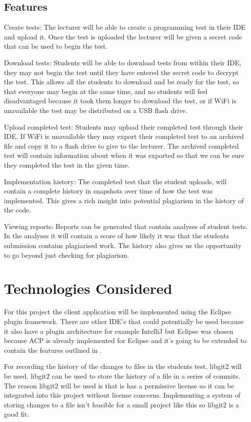 \documentclass[twocolumn]{article}
\begin{document}
\subsection{Features} \label{sec:Features}
Create tests: The lecturer will be able to create a programming test in their
IDE and upload it. Once the test is uploaded the lecturer will be given a secret
code that can be used to begin the test.

Download tests: Students will be able to download tests from within their IDE,
they may not begin the test until they have entered the secret code to decrypt
the test. This allows all the students to download and be ready for the test, so
that everyone may begin at the same time, and no students will feel
disadvantaged because it took them longer to download the test, or if WiFi is
unavailable the test may be distributed on a USB flash drive.

Upload completed test: Students may upload their completed test through their
IDE. If WiFi is unavailable they may export their completed test to an archived
file and copy it to a flash drive to give to the lecturer. The archived
completed test will contain information about when it was exported so that we
can be sure they completed the test in the given time.

Implementation history: The completed test that the student uploads, will
contain a complete history in snapshots over time of how the test was
implemented. This gives a rich insight into potential plagiarism in the history
of the code.

Viewing reports: Reports can be generated that contain analyses of student
tests. In the analyses it will contain a score of how likely it was that the
students submission contains plagiarised work. The history also gives us the
opportunity to go beyond just checking for plagiarism.

\section{Technologies Considered}
For this project the client application will be implemented using the Eclipse
plugin framework. There are other IDE's that could potentially be used because
it also have a plugin architecture for example IntelliJ but Eclipse was chosen
because ACP is already implemented for Eclipse and it's going to be extended to
contain the features outlined in .

For recording the history of the changes to files in the students test, libgit2
will be used. libgit2 can be used to store the history of a file in a series of
commits. The reason libgit2 will be used is that is has a permissive license so
it can be integrated into this project without license concerns. Implementing a
system of storing changes to a file isn't feasible for a small project like this
so libgit2 is a good fit.
\end{document}
